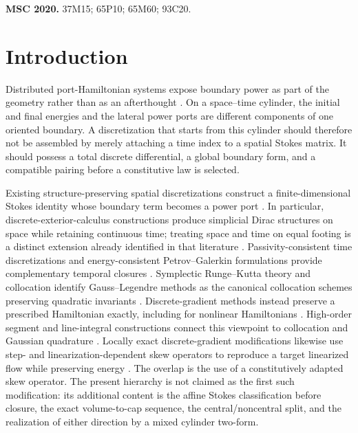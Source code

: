 \documentclass[11pt,a4paper]{article}
\begin{document}
\medskip
\noindent\textbf{MSC 2020.}
37M15; 65P10; 65M60; 93C20.

\section{Introduction}

Distributed port-Hamiltonian systems expose boundary power as part of the
geometry rather than as an afterthought
\cite{vanderschaft2002,kotyczka2018}.  On a space--time cylinder, the
initial and final energies and the lateral power ports are different
components of one oriented boundary.  A discretization that starts from
this cylinder should therefore not be assembled by merely attaching a
time index to a spatial Stokes matrix.  It should possess a total discrete
differential, a global boundary form, and a compatible pairing before a
constitutive law is selected.

Existing structure-preserving spatial discretizations construct a
finite-dimensional Stokes identity whose boundary term becomes a power
port \cite{moulla2012,seslija2012,brugnoli2022}.  In particular,
discrete-exterior-calculus constructions produce simplicial Dirac
structures on space while retaining continuous time; treating space and
time on equal footing is a distinct extension already identified in that
literature \cite{seslija2012}.  Passivity-consistent time discretizations
and energy-consistent
Petrov--Galerkin formulations provide complementary temporal closures
\cite{celledoni2017,giesselmann2025}.  Symplectic Runge--Kutta theory and
collocation identify Gauss--Legendre methods as the canonical collocation
schemes preserving quadratic invariants
\cite{cooper1987,sanzserna1988,reich2000,hairer2006}.  Discrete-gradient
methods instead preserve a prescribed Hamiltonian exactly, including for
nonlinear Hamiltonians
\cite{mclachlan1999,gonzalez1996,quispel2008,eidnes2022}.  High-order
segment and line-integral constructions connect this viewpoint to
collocation and Gaussian quadrature
\cite{hairer2010,brugnano2010,miyatake2016,kemmochi2023}.  Locally exact
discrete-gradient modifications likewise use step- and
linearization-dependent skew operators to reproduce a target linearized
flow while preserving energy \cite{cieslinski2013}.  The overlap is the
use of a constitutively adapted skew operator.  The present hierarchy is
not claimed as the first such modification: its additional content is the
affine Stokes classification before closure, the exact volume-to-cap
sequence, the central/noncentral split, and the realization of either
direction by a mixed cylinder two-form.
\end{document}
